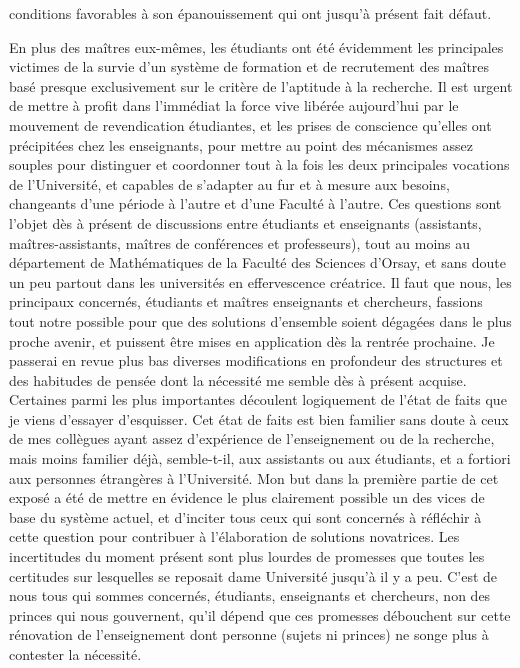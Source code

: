 
conditions favorables à son épanouissement qui ont jusqu'à présent fait défaut.

En plus des maîtres eux-mêmes, les étudiants ont été évidemment les
principales victimes de la survie d'un système de formation et de recrutement
des maîtres basé presque exclusivement sur le critère de l'aptitude à la
recherche. Il est urgent de mettre à profit dans l'immédiat la force vive
libérée aujourd'hui par le mouvement de revendication étudiantes, et les
prises de conscience qu'elles ont précipitées chez les enseignants, pour
mettre au point des mécanismes assez souples pour distinguer et coordonner
tout à la fois les deux principales vocations de l'Université, et capables
de s'adapter au fur et à mesure aux besoins, changeants d'une période à l'autre
et d'une Faculté à l'autre. Ces questions sont l'objet dès à présent de
discussions entre étudiants et enseignants (assistants, maîtres-assistants,
maîtres de conférences et professeurs), tout au moins au département de
Mathématiques de la Faculté des Sciences d'Orsay, et sans doute un peu partout
dans les universités en effervescence créatrice. Il faut que nous, les
principaux concernés, étudiants et maîtres enseignants et chercheurs, fassions
tout notre possible pour que des solutions d'ensemble soient dégagées dans
le plus proche avenir, et puissent être mises en application dès la rentrée
prochaine. Je passerai en revue plus bas diverses modifications en profondeur
des structures et des habitudes de pensée dont la nécessité me semble dès
à présent acquise. Certaines parmi les plus importantes découlent logiquement
de l'état de faits que je viens d'essayer d'esquisser. Cet état de faits
est bien familier sans doute à ceux de mes collègues ayant assez d'expérience
de l'enseignement ou de la recherche, mais moins familier déjà, semble-t-il,
aux assistants ou aux étudiants, et a fortiori aux personnes étrangères à
l'Université. Mon but dans la première partie de cet exposé a été de mettre
en évidence le plus clairement possible un des vices de base du système actuel,
et d'inciter tous ceux qui sont concernés à réfléchir à cette question pour
contribuer à l'élaboration de solutions novatrices. Les incertitudes du moment
présent sont plus lourdes de promesses que toutes les certitudes sur lesquelles
se reposait dame Université jusqu'à il y a peu. C'est de nous tous qui sommes
concernés, étudiants, enseignants et chercheurs, non des princes qui nous
gouvernent, qu'il dépend que ces promesses débouchent sur cette rénovation
de l'enseignement dont personne (sujets ni princes) ne songe plus à contester
la nécessité.

